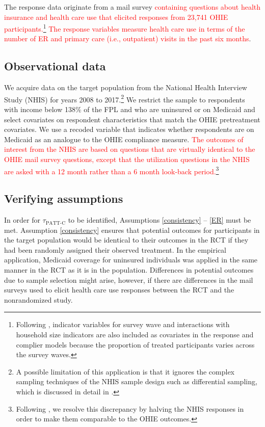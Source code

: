 \documentclass[hidelinks,12pt]{article}
\begin{document}
The response data originate from a mail survey \textcolor{red}{containing questions about health insurance and health care use that elicited responses from 23,741 OHIE participants.\footnote{Following \citet{finkelstein2012}, indicator variables for survey wave and interactions with household size indicators are also included as covariates in the response and complier models because the proportion of treated participants varies across the survey waves.} The response variables measure health care use in terms of the number of ER and primary care (i.e., outpatient) visits in the past six months}. 

\subsection{Observational data} 

We acquire data on the target population from the National Health Interview Study (NHIS) for years 2008 to 2017.\footnote{A possible limitation of this application is that it ignores the complex sampling techniques of the NHIS sample design such as differential sampling, which is discussed in detail in \citet{parsons2014design}.} We restrict the sample to respondents with income below 138\% of the FPL and who are uninsured or on Medicaid and select covariates on respondent characteristics that match the OHIE pretreatment covariates. We use a recoded variable that indicates whether respondents are on Medicaid as an analogue to the OHIE compliance measure. \textcolor{red}{The outcomes of interest from the NHIS are based on questions that are virtually identical to the OHIE mail survey questions, except that the utilization questions in the NHIS are asked with a 12 month rather than a 6 month look-back period.\footnote{Following \citet{finkelstein2012}, we resolve this discrepancy by halving the NHIS responses in order to make them comparable to the OHIE outcomes.}}

\subsection{Verifying assumptions} \label{verifying}

In order for $\tau_{\text{PATT-C}}$ to be identified, Assumptions \eqref{consistency} -- \eqref{ER} must be met. Assumption \eqref{consistency} ensures that potential outcomes for participants in the target population would be identical to their outcomes in the RCT if they had been randomly assigned their observed treatment. In the empirical application, Medicaid coverage for uninsured individuals was applied in the same manner in the RCT as it is in the population.  Differences in potential outcomes due to sample selection might arise, however, if there are differences in the mail surveys used to elicit health care use responses between the RCT and the nonrandomized study. 
\end{document}
